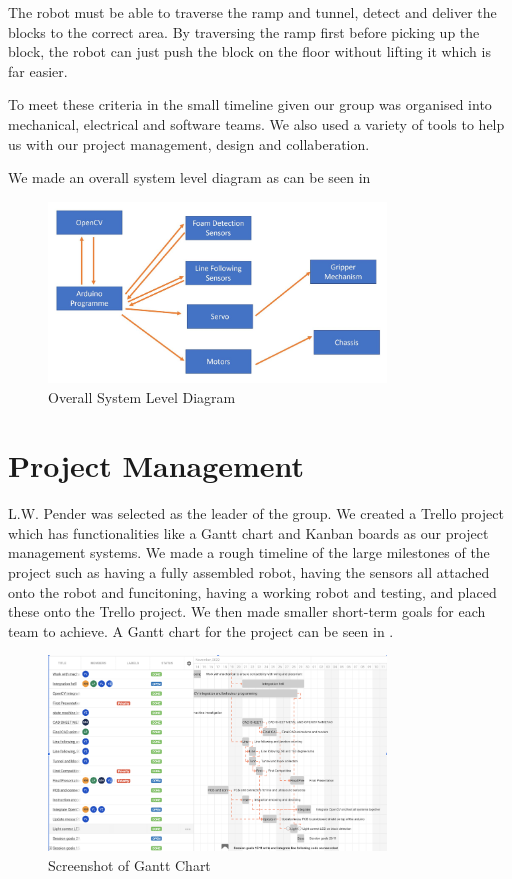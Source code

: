\documentclass{article}
\begin{document}
\quad The robot must be able to traverse the ramp and tunnel, detect and deliver the blocks to the correct area. By traversing the ramp first before picking up the block, the robot can just push the block on the floor without lifting it which is far easier.

\quad To meet these criteria in the small timeline given our group was organised into mechanical, electrical and software teams. We also used a variety of tools to help us with our project management, design and collaberation.

\quad We made an overall system level diagram as can be seen in 

\begin{figure}[!h]
    \centering
    \includegraphics[width=0.8\textwidth]{assets/Overall_sys.jpg}
    \caption{Overall System Level Diagram}
    \label{fig:overall_sys}
\end{figure}

\section{Project Management}
\quad L.W. Pender was selected as the leader of the group. We created a Trello project which has functionalities like a Gantt chart and Kanban boards as our project management systems. We made a rough timeline of the large milestones of the project such as having a fully assembled robot, having the sensors all attached onto the robot and funcitoning, having a working robot and testing, and placed these onto the Trello project. We then made smaller short-term goals for each team to achieve. A Gantt chart for the project can be seen in .

\begin{figure}[!h]
    \centering
    \includegraphics[width=0.8\textwidth]{assets/Gantt.png}
    \caption{Screenshot of Gantt Chart}
    \label{fig:gantt}
\end{figure}
    
\end{document}
